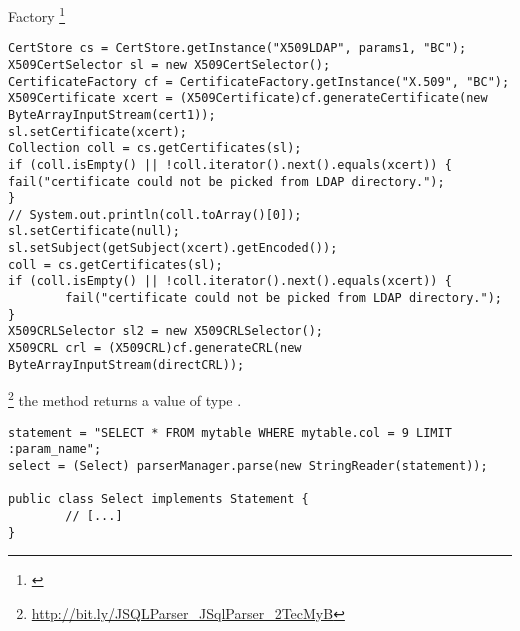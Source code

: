 \begin{pattern}{Factory}
\footnote{\url{}}

\begin{verbatim}
CertStore cs = CertStore.getInstance("X509LDAP", params1, "BC");
X509CertSelector sl = new X509CertSelector();
CertificateFactory cf = CertificateFactory.getInstance("X.509", "BC");
X509Certificate xcert = (X509Certificate)cf.generateCertificate(new ByteArrayInputStream(cert1));
sl.setCertificate(xcert);
Collection coll = cs.getCertificates(sl);
if (coll.isEmpty() || !coll.iterator().next().equals(xcert)) {
fail("certificate could not be picked from LDAP directory.");
}
// System.out.println(coll.toArray()[0]);
sl.setCertificate(null);
sl.setSubject(getSubject(xcert).getEncoded());
coll = cs.getCertificates(sl);
if (coll.isEmpty() || !coll.iterator().next().equals(xcert)) {
        fail("certificate could not be picked from LDAP directory.");
}
X509CRLSelector sl2 = new X509CRLSelector();
X509CRL crl = (X509CRL)cf.generateCRL(new ByteArrayInputStream(directCRL));
\end{verbatim}


\footnote{\url{http://bit.ly/JSQLParser_JSqlParser_2TecMyB}}
the  method returns a value of type .

\begin{verbatim}
statement = "SELECT * FROM mytable WHERE mytable.col = 9 LIMIT :param_name";
select = (Select) parserManager.parse(new StringReader(statement));

public class Select implements Statement {
        // [...]
}
\end{verbatim}


\detection{}

\discussion{}

\related{}

\end{pattern}